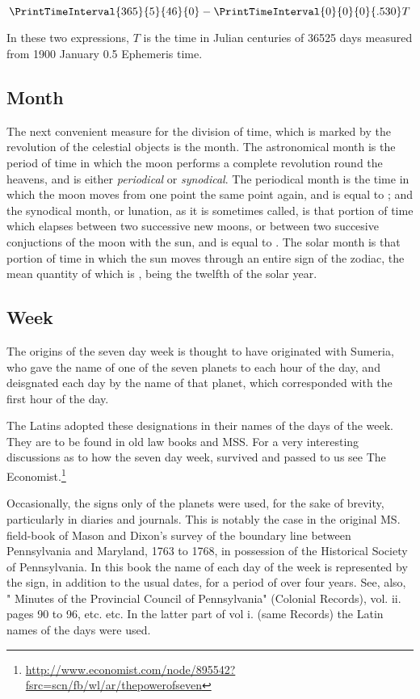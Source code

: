 \begin{equation}
\PrintTimeInterval {365}{5}{46}{0} - \PrintTimeInterval {0}{0}{0}{.530}T
\end{equation}

In these two expressions, $T$ is the time in Julian centuries of 36525 days measured from 1900 January 0.5 Ephemeris time. 

\subsection{Month}

The next convenient measure for the division of time, which is marked by the revolution of the
celestial objects is the month. The astronomical month is the period of time in which the moon 
performs a complete revolution round the heavens, and is either \textit{periodical} or \textit{synodical}. The periodical
month is the time in which the moon moves from one point the same point again, and is equal to ; and the synodical month, or lunation, as it is sometimes called, is that portion of time which
elapses between two successive new moons, or between two succesive conjuctions of the moon with the sun, and is equal to .  The solar month is that portion of time in which the sun moves through an
entire sign of the zodiac, the mean quantity of which is , being the twelfth of the
solar year.


\subsection{Week}

The origins of the seven day week is thought to have originated with Sumeria, who gave the name
of one of the seven planets to each hour of the day, and deisgnated each day by the name of that planet, which corresponded with the first hour of the day. 

The Latins adopted these designations in their names of 
the days of the week. They are to be found in old law books 
and MSS. For a very interesting discussions as to how the seven
day week, survived and passed to us see The Economist.\footnote{\protect\url{http://www.economist.com/node/895542?fsrc=scn/fb/wl/ar/thepowerofseven}}

Occasionally, the signs only of the planets were used, for 
the sake of brevity, particularly in diaries and journals. This 
is notably the case in the original MS. field-book of Mason 
and Dixon's survey of the boundary line between Pennsylvania and Maryland, 1763 to 1768, 
in possession of the Historical 
Society of Pennsylvania. In this book the name of 
each day of the week is represented by the sign, in addition 
to the usual dates, for a period of over four years. See, also, 
" Minutes of the Provincial Council of Pennsylvania" (Colonial Records), vol. ii. pages 90 to 96, etc. etc. In the latter 
part of vol i. (same Records) the Latin names of the days 
were used. 

